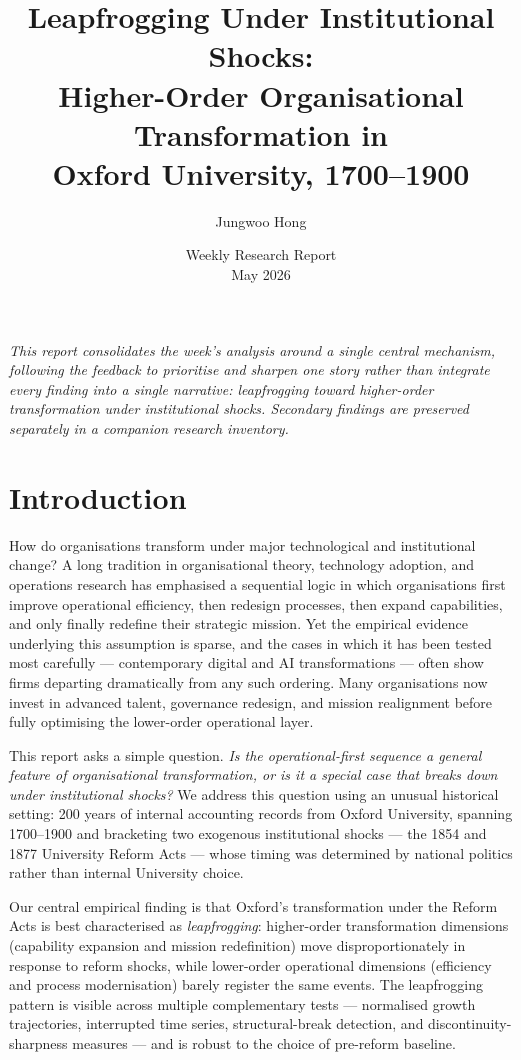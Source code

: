 \documentclass[11pt]{article}
\title{\textbf{Leapfrogging Under Institutional Shocks:\\
Higher-Order Organisational Transformation in\\
Oxford University, 1700--1900}}
\author{Jungwoo Hong}
\date{Weekly Research Report \\ May 2026}
\begin{document}
\maketitle

\noindent\emph{This report consolidates the week's analysis around a single central mechanism, following the feedback to prioritise and sharpen one story rather than integrate every finding into a single narrative: leapfrogging toward higher-order transformation under institutional shocks. Secondary findings are preserved separately in a companion research inventory.}


\section{Introduction}

How do organisations transform under major technological and institutional change? A long tradition in organisational theory, technology adoption, and operations research has emphasised a sequential logic in which organisations first improve operational efficiency, then redesign processes, then expand capabilities, and only finally redefine their strategic mission. Yet the empirical evidence underlying this assumption is sparse, and the cases in which it has been tested most carefully --- contemporary digital and AI transformations --- often show firms departing dramatically from any such ordering. Many organisations now invest in advanced talent, governance redesign, and mission realignment before fully optimising the lower-order operational layer.

This report asks a simple question. \emph{Is the operational-first sequence a general feature of organisational transformation, or is it a special case that breaks down under institutional shocks?} We address this question using an unusual historical setting: 200 years of internal accounting records from Oxford University, spanning 1700--1900 and bracketing two exogenous institutional shocks --- the 1854 and 1877 University Reform Acts --- whose timing was determined by national politics rather than internal University choice.

Our central empirical finding is that Oxford's transformation under the Reform Acts is best characterised as \emph{leapfrogging}: higher-order transformation dimensions (capability expansion and mission redefinition) move disproportionately in response to reform shocks, while lower-order operational dimensions (efficiency and process modernisation) barely register the same events. The leapfrogging pattern is visible across multiple complementary tests --- normalised growth trajectories, interrupted time series, structural-break detection, and discontinuity-sharpness measures --- and is robust to the choice of pre-reform baseline.
\end{document}

